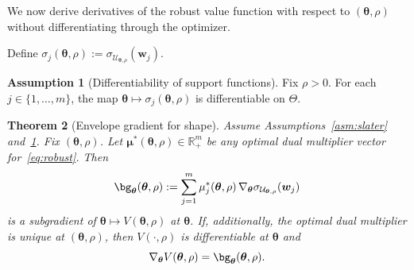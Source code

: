 \documentclass[11pt]{article}
\newcommand{\R}{\mathbb{R}}
\newcommand{\cU}{\mathcal{U}}
\newcommand{\btheta}{\bm{\theta}}
\newcommand{\bw}{\bm{w}}
\newcommand{\bmu}{\bm{\mu}}
\theoremstyle{plain}
\newtheorem{theorem}{Theorem}
\theoremstyle{definition}
\newtheorem{assumption}[theorem]{Assumption}
\begin{document}
We now derive derivatives of the robust value function with respect to $(\btheta,\rho)$ without differentiating through the optimizer.

Define $\sigma_j(\btheta,\rho):=\sigma_{\cU_{\btheta,\rho}}(\bw_j)$.

\begin{assumption}[Differentiability of support functions]\label{asm:sigma-diff}
Fix $\rho>0$. For each $j\in\{1,\dots,m\}$, the map $\btheta\mapsto \sigma_j(\btheta,\rho)$ is differentiable on $\Theta$.
\end{assumption}

\begin{theorem}[Envelope gradient for shape]\label{thm:envelope-theta}
Assume Assumptions~\ref{asm:slater} and~\ref{asm:sigma-diff}. Fix $(\btheta,\rho)$.
Let $\bmu^*(\btheta,\rho)\in \R_+^m$ be any optimal dual multiplier vector for~\eqref{eq:robust}.
Then
\begin{equation}\label{eq:env-theta}
\bg_{\btheta}(\btheta,\rho)
:=\sum_{j=1}^m \mu_j^*(\btheta,\rho)\,\nabla_{\btheta}\sigma_{\cU_{\btheta,\rho}}(\bw_j)
\end{equation}
is a subgradient of $\btheta\mapsto V(\btheta,\rho)$ at $\btheta$.
If, additionally, the optimal dual multiplier is unique at $(\btheta,\rho)$, then $V(\cdot,\rho)$ is differentiable at $\btheta$ and
\[
\nabla_{\btheta}V(\btheta,\rho)=\bg_{\btheta}(\btheta,\rho).
\]
\end{theorem}
\end{document}
